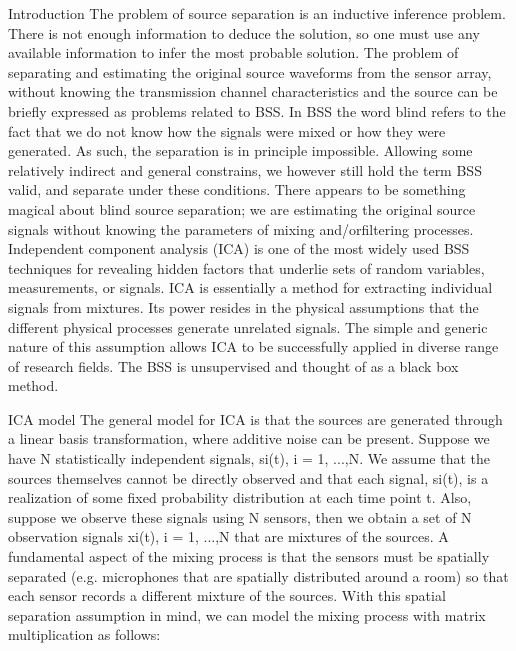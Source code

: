\cite{journals/informaticaSI/NaikK11}
\begin{compactitem}

\item {Introduction}
The problem of source separation is an inductive inference problem. There is not enough information
to deduce the solution, so one must use any available information to infer the most probable solution.
The problem of separating and estimating the original source waveforms from the sensor array, 
without knowing the transmission channel characteristics and the source can be briefly expressed
as problems related to BSS. In BSS the word blind refers to the fact that we do not know how the signals
were mixed or how they were generated. As such, the separation is in principle impossible. Allowing some relatively indirect and general constrains, we however still hold the term BSS valid, and separate under these conditions. There appears to be something magical about blind source separation; we are estimating the original source signals without knowing the parameters of mixing and/orfiltering processes. Independent component analysis (ICA) is one of the most widely used BSS techniques for revealing hidden factors that underlie sets of random variables, measurements, or signals. ICA is essentially a method for extracting individual
signals from mixtures. Its power resides in the physical assumptions that the different physical processes
generate unrelated signals. The simple and generic nature of this assumption allows ICA to be successfully applied in diverse range of research fields. The BSS is unsupervised and thought of as a black box method.

\item {ICA model}
The general model for ICA is that the sources are generated
through a linear basis transformation, where additive
noise can be present. Suppose we have N statistically independent
signals, si(t), i = 1, ...,N. We assume that the
sources themselves cannot be directly observed and that
each signal, si(t), is a realization of some fixed probability
distribution at each time point t. Also, suppose we observe
these signals using N sensors, then we obtain a set of N observation
signals xi(t), i = 1, ...,N that are mixtures of the
sources. A fundamental aspect of the mixing process is that
the sensors must be spatially separated (e.g. microphones
that are spatially distributed around a room) so that each
sensor records a different mixture of the sources. With this
spatial separation assumption in mind, we can model the
mixing process with matrix multiplication as follows:


\end{compactitem}
